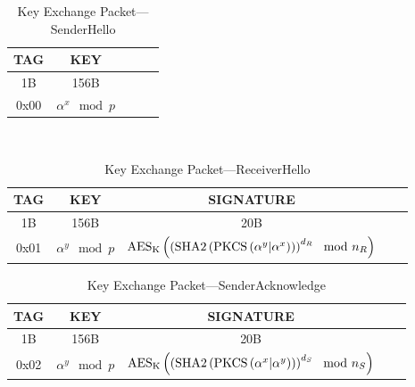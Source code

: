 \documentclass[a4paper]{article}
\begin{document}
\begin{table}[H]
    \begin{center}
        \begin{tabular}{| c | c | c | c | c |}
            \hline
            TAG & KEY \\ \hline\hline
            1B & 156B \\ \hline
            0x00 & $\alpha^x\mod{p}$ \\
            \hline
        \end{tabular}
    \end{center}
    \
    \caption{Key Exchange Packet---SenderHello}
    \label{tab:key_exchange_packet_senderhello}
\end{table}
\begin{table}[H]
    \begin{center}
        \begin{tabular}{| c | c | c | c | c |}
            \hline
            TAG & KEY & SIGNATURE \\ \hline\hline
            1B & 156B & 20B \\ \hline
            0x01 & $\alpha^y\mod{p}$ & $\text{AES}_\text{K}\left(\left(\text{SHA2}\left(\text{PKCS}\left(\alpha^y\small|\alpha^x\right)\right)\right)^{d_R}\mod{n_R}\right)$\\
            \hline
        \end{tabular}
    \end{center}
    
    \caption{Key Exchange Packet---ReceiverHello}
    \label{tab:key_exchange_packet_receiverhello}
\end{table}
\begin{table}[H]
    \begin{center}
        \begin{tabular}{| c | c | c | c | c |}
            \hline
            TAG & KEY & SIGNATURE \\ \hline\hline
            1B & 156B & 20B \\ \hline
            0x02 & $\alpha^y\mod{p}$ & $\text{AES}_\text{K}\left(\left(\text{SHA2}\left(\text{PKCS}\left(\alpha^x \small|\alpha^y\right)\right)\right)^{d_S}\mod{n_S}\right)$\\
            \hline
        \end{tabular}
    \end{center}

    \caption{Key Exchange Packet---SenderAcknowledge}
    \label{tab:key_exchange_packet_senderacknowledge}
\end{table}
\end{document}
